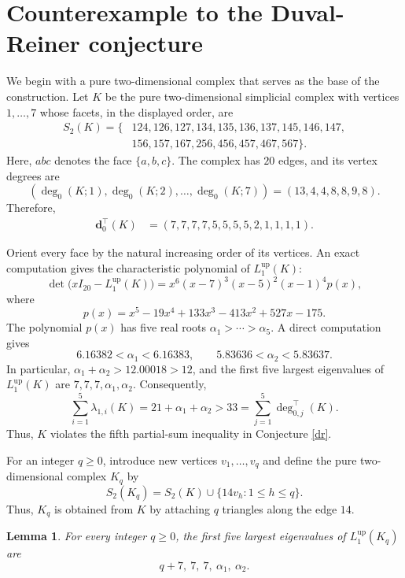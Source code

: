 \documentclass[12pt]{amsart}
\theoremstyle{plain}
\newtheorem{lem}[thm]{Lemma}
\theoremstyle{definition}
\numberwithin{equation}{section}
\numberwithin{figure}{section}
\newcommand{\dd}{\mathbf d}
\newcommand{\Lup}{L^{\operatorname{up}}}
\begin{document}
\section{Counterexample to the Duval-Reiner conjecture}\label{counter}
We begin with a pure two-dimensional complex that serves as the base of the construction.
Let $K$ be the pure two-dimensional simplicial complex with vertices  $1,\ldots,7$ whose facets, in the displayed order, are
\[
\begin{aligned}
S_2(K) = \{&124,126,127,134,135,136,137,145,146,147,\\
&156,157,167,256,456,457,467,567\}.
\end{aligned}
\]
Here, $abc$ denotes the face $\{a,b,c\}$.
The complex has $20$ edges, and its vertex degrees are
\[
(\deg_0(K;1),\deg_0(K;2),\ldots,\deg_0(K;7)) = (13,4,4,8,8,9,8).
\]
Therefore,
\[
\begin{aligned}
\dd_0^\top(K) &= (7,7,7,7,5,5,5,5,2,1,1,1,1).
\end{aligned}
\]


Orient every face by the natural increasing order of its vertices.
An exact computation gives the characteristic polynomial of $\Lup_1(K)$: 
\[
\det\bigl(xI_{20}-\Lup_1(K)\bigr)
=
x^6(x-7)^3(x-5)^2(x-1)^4p(x),
\]
where
\[
p(x) = x^5 - 19x^4 + 133x^3 - 413x^2 + 527x - 175.
\]
The polynomial $p(x)$ has five real roots $\alpha_1 > \cdots > \alpha_5$.
A direct computation gives
\[
6.16382 < \alpha_1 < 6.16383,
\qquad
5.83636 < \alpha_2 < 5.83637.
\]
In particular, $\alpha_1 + \alpha_2 > 12.00018 > 12$, and the first five largest eigenvalues of $\Lup_1(K)$ are $7,7,7,\alpha_1,\alpha_2$.
Consequently,
\[
\sum_{i = 1}^5 \lambda_{1,i}(K)
=
21 + \alpha_1 + \alpha_2
>
33
=
\sum_{j = 1}^5 \deg^\top_{0,j}(K).
\]
Thus, $K$ violates the fifth partial-sum inequality in Conjecture \ref{dr}.

For an integer $q \geq 0$, introduce new vertices $v_1,\ldots,v_q$ and define the pure two-dimensional complex $K_q$ by
\[
S_2(K_q)
=
S_2(K)
\cup
\{14v_h : 1 \leq h \leq q\}.
\]
Thus, $K_q$ is obtained from $K$ by attaching $q$ triangles along the edge $14$.

\begin{lem}\label{complex-sum}
For every integer $q \geq 0$, the first five largest eigenvalues of $\Lup_1(K_q)$ are
\[
q+7,\ 7,\ 7,\ \alpha_1,\ \alpha_2.
\]
\end{lem}
\end{document}

